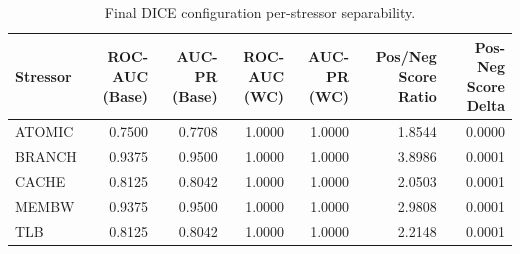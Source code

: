 \begin{table}[t]
\centering
\caption{Final DICE configuration per-stressor separability.}
\label{tab:dice_full_stressor}
\footnotesize
\begin{tabular}{lrrrrrr}
\toprule
Stressor & ROC-AUC (Base) & AUC-PR (Base) & ROC-AUC (WC) & AUC-PR (WC) & Pos/Neg Score Ratio & Pos-Neg Score Delta \\
\midrule
ATOMIC & 0.7500 & 0.7708 & 1.0000 & 1.0000 & 1.8544 & 0.0000 \\
BRANCH & 0.9375 & 0.9500 & 1.0000 & 1.0000 & 3.8986 & 0.0001 \\
CACHE & 0.8125 & 0.8042 & 1.0000 & 1.0000 & 2.0503 & 0.0001 \\
MEMBW & 0.9375 & 0.9500 & 1.0000 & 1.0000 & 2.9808 & 0.0001 \\
TLB & 0.8125 & 0.8042 & 1.0000 & 1.0000 & 2.2148 & 0.0001 \\
\bottomrule
\end{tabular}

\end{table}
